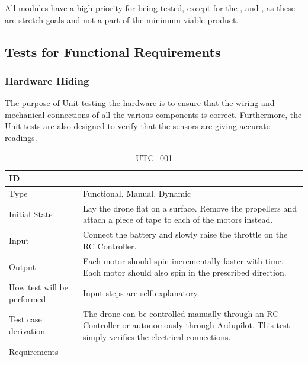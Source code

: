 \documentclass[12pt, titlepage]{article}
\begin{document}
All modules have a high priority for being tested, except for the , and , as these are stretch goals and not a part of the minimum viable product.


\subsection{Tests for Functional Requirements}

\subsubsection{Hardware Hiding}

The purpose of Unit testing the hardware is to ensure that the wiring and mechanical connections of all the various components is correct. Furthermore, the Unit tests are also designed to verify that the sensors are giving accurate readings. 

\begin{table}[!h]
\begin{center}
\caption {UTC\_001}
\label{tab:UTC_001}
\begin{tabular}{ | m{3.2cm} | m{12.2cm} | } 
\hline
ID & \nameref{tab:UTC_001} \\ 
\hline
Type &  Functional, Manual, Dynamic  \\ 
\hline
Initial State & Lay the drone flat on a surface. Remove the propellers and attach a piece of tape to each of the motors instead.\\ 
\hline
Input & Connect the battery and slowly raise the throttle on the RC Controller.
 \\ 
\hline
Output &  Each motor should spin incrementally faster with time. Each motor should also spin in the prescribed direction. \\ 
\hline
How test will be performed & Input steps are self-explanatory. \\ 
\hline
Test case derivation & The drone can be controlled manually through an RC Controller or autonomously through Ardupilot. This test simply verifies the electrical connections.   \\ 
\hline
Requirements &  \\ 
\hline
\end{tabular}
\end{center}
\end{table}
\end{document}
